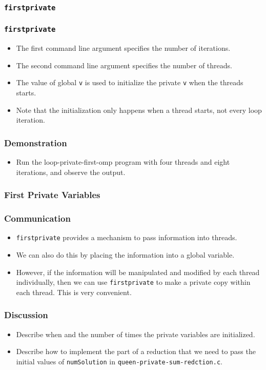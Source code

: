 \documentclass{beamer}
\begin{document}
\begin{frame}
\frametitle{\tt firstprivate} 
\end{frame}

\begin{frame}
\frametitle{\tt firstprivate}
\begin{itemize}
\item The first command line argument specifies the number of iterations.
\item The second command line argument specifies the number of threads.
\item The value of global {\tt v} is used to initialize the private
  {\tt v} when the threads starts.
\item Note that the initialization only happens when a thread starts,
  not every loop iteration.
\end{itemize}
\end{frame}

\begin{frame}
\frametitle{Demonstration}
\begin{itemize}
\item Run the loop-private-first-omp program with four threads and
  eight iterations, and observe the output.
\end{itemize}
\end{frame}

\begin{frame}
\frametitle{First Private Variables}
\centerline{}
\end{frame}

\begin{frame}
\frametitle{Communication}
\begin{itemize}
\item {\tt firstprivate} provides a mechanism to pass information
  into threads.
\item We can also do this by placing the information into a global
  variable.  
\item However, if the information will be manipulated and modified by
  each thread individually, then we can use {\tt firstprivate} to make
  a private copy within each thread.  This is very convenient.
\end{itemize}
\end{frame}

\begin{frame}
\frametitle{Discussion}
\begin{itemize}
\item Describe when and the number of times the private variables are
  initialized.
\item Describe how to implement the part of a reduction that we need
  to pass the initial values of {\tt numSolution} in {\tt queen-private-sum-redction.c}.
\end{itemize}
\end{frame}
\end{document}
